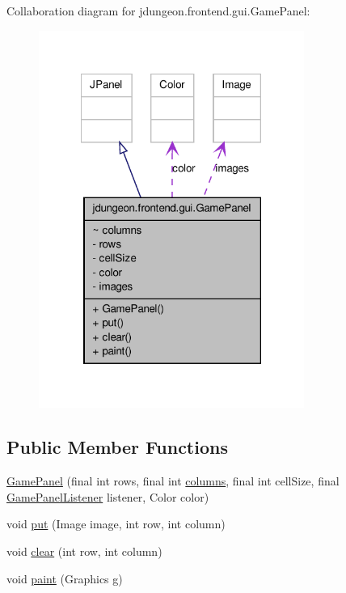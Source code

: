 Collaboration diagram for jdungeon.frontend.gui.GamePanel:
\nopagebreak
\begin{figure}[H]
\begin{center}
\leavevmode
\includegraphics[width=246pt]{classjdungeon_1_1frontend_1_1gui_1_1_game_panel__coll__graph}
\end{center}
\end{figure}
\subsection*{Public Member Functions}
\begin{DoxyCompactItemize}
\item 
\hyperlink{classjdungeon_1_1frontend_1_1gui_1_1_game_panel_a2411a4141e1a41d08b3165f47982753d}{GamePanel} (final int rows, final int \hyperlink{classjdungeon_1_1frontend_1_1gui_1_1_game_panel_aba784807153277ead51c3af9df110bbd}{columns}, final int cellSize, final \hyperlink{interfacejdungeon_1_1frontend_1_1gui_1_1_game_panel_listener}{GamePanelListener} listener, Color color)
\item 
void \hyperlink{classjdungeon_1_1frontend_1_1gui_1_1_game_panel_abbc1891b5fca5d12ffe8d5ca3cacf1cd}{put} (Image image, int row, int column)
\item 
void \hyperlink{classjdungeon_1_1frontend_1_1gui_1_1_game_panel_aaad23918d8ac09aa15007f21932ed06d}{clear} (int row, int column)
\item 
void \hyperlink{classjdungeon_1_1frontend_1_1gui_1_1_game_panel_afa811bf3d6906c3ed3d73fc5cfd6a3dc}{paint} (Graphics g)
\end{DoxyCompactItemize}
